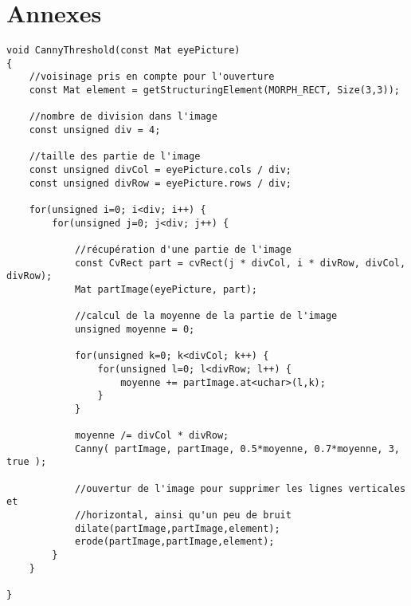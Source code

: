 \section*{Annexes}

\begin{lstlisting}[caption=Application du filtre de Canny sur des parties de l'image avec la moyenne des niveaux de gris]
void CannyThreshold(const Mat eyePicture)
{
    //voisinage pris en compte pour l'ouverture
    const Mat element = getStructuringElement(MORPH_RECT, Size(3,3));

    //nombre de division dans l'image
    const unsigned div = 4;

    //taille des partie de l'image
    const unsigned divCol = eyePicture.cols / div;
    const unsigned divRow = eyePicture.rows / div;

    for(unsigned i=0; i<div; i++) {
        for(unsigned j=0; j<div; j++) {

            //récupération d'une partie de l'image
            const CvRect part = cvRect(j * divCol, i * divRow, divCol, divRow);
            Mat partImage(eyePicture, part);

            //calcul de la moyenne de la partie de l'image
            unsigned moyenne = 0;

            for(unsigned k=0; k<divCol; k++) {
                for(unsigned l=0; l<divRow; l++) {
                    moyenne += partImage.at<uchar>(l,k);
                }
            }

            moyenne /= divCol * divRow;
            Canny( partImage, partImage, 0.5*moyenne, 0.7*moyenne, 3, true );

            //ouvertur de l'image pour supprimer les lignes verticales et
            //horizontal, ainsi qu'un peu de bruit
            dilate(partImage,partImage,element);
            erode(partImage,partImage,element);
        }
    }

}
 
\end{lstlisting}


\newpage